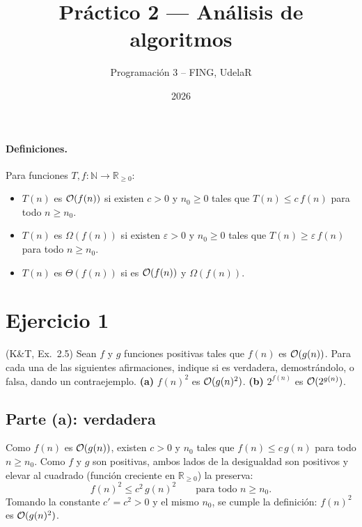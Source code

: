 

\title{Práctico 2 --- Análisis de algoritmos}
\author{Programación 3 -- FING, UdelaR}
\date{2026}


\maketitle

\paragraph{Definiciones.} Para funciones $T,f:\mathbb{N}\to\mathbb{R}_{\ge 0}$:
\begin{itemize}
  \item $T(n)$ es $\mathcal{O}(f(n))$ si existen $c>0$ y $n_0\ge 0$ tales que $T(n)\le c\,f(n)$ para
        todo $n\ge n_0$.
  \item $T(n)$ es $\Omega(f(n))$ si existen $\varepsilon>0$ y $n_0\ge 0$ tales que
        $T(n)\ge \varepsilon\, f(n)$ para todo $n\ge n_0$.
  \item $T(n)$ es $\Theta(f(n))$ si es $\mathcal{O}(f(n))$ y $\Omega(f(n))$.
\end{itemize}

\section{Ejercicio 1}

\begin{enunciado}
(K\&T, Ex.~2.5) Sean $f$ y $g$ funciones positivas tales que $f(n)$ es $\mathcal{O}(g(n))$. Para cada
una de las siguientes afirmaciones, indique si es verdadera, demostrándolo, o falsa, dando un
contraejemplo.
\textbf{(a)} $f(n)^2$ es $\mathcal{O}(g(n)^2)$.
\textbf{(b)} $2^{f(n)}$ es $\mathcal{O}(2^{g(n)})$.
\end{enunciado}


\subsection*{Parte (a): verdadera}
Como $f(n)$ es $\mathcal{O}(g(n))$, existen $c>0$ y $n_0$ tales que $f(n)\le c\,g(n)$ para todo
$n\ge n_0$. Como $f$ y $g$ son positivas, ambos lados de la desigualdad son positivos y
elevar al cuadrado (función creciente en $\mathbb{R}_{\ge0}$) la preserva:
\[
f(n)^2\le c^2\,g(n)^2\qquad\text{para todo } n\ge n_0 .
\]
Tomando la constante $c'=c^2>0$ y el mismo $n_0$, se cumple la definición: $f(n)^2$ es
$\mathcal{O}(g(n)^2)$.

